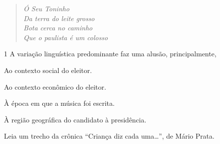 \medskip

\begin{quote}
\centering \emph{Ó Seu Toninho\\
Da terra do leite grosso\\
Bota cerca no caminho\\
Que o paulista é um colosso\\}
\end{quote}

\smallskip

\num{1} A variação linguística predominante faz uma alusão, principalmente,

\begin{escolha}
\item Ao contexto social do eleitor.
\item Ao contexto econômico do eleitor.
\item À época em que a música foi escrita.
\item À região geográfica do candidato à presidência.
\end{escolha}



Leia um trecho da crônica ``Criança diz cada uma\ldots{}'', de Mário
Prata.

